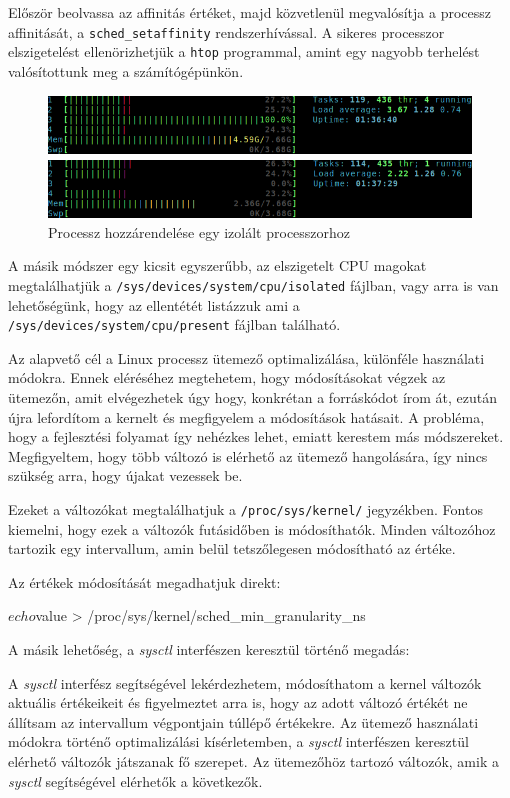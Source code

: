 Először beolvassa az affinitás értéket, majd közvetlenül megvalósítja a processz affinitását, a \texttt{sched\_setaffinity} rendszerhívással.
A sikeres processzor elszigetelést ellenörizhetjük a \texttt{htop} programmal, amint egy nagyobb terhelést valósítottunk meg a számítógépünkön.

\begin{figure}[h!]
\centering
\includegraphics[width=\textwidth]{images/tasksetHtop.png}
\caption{Processz hozzárendelése egy izolált processzorhoz}
\label{fig:taskset}
\end{figure}

A másik módszer egy kicsit egyszerűbb, az elszigetelt CPU magokat megtalálhatjük a \texttt{/sys/devices/system/cpu/isolated} fájlban, vagy arra is van lehetőségünk, hogy az ellentétét listázzuk ami a \texttt{/sys/devices/system/cpu/present} fájlban található.

Az alapvető cél a Linux processz ütemező optimalizálása, különféle használati módokra.
Ennek eléréséhez megtehetem, hogy módosításokat végzek az ütemezőn, amit elvégezhetek úgy hogy, konkrétan a forráskódot írom át, ezután újra lefordítom a kernelt és megfigyelem a módosítások hatásait.
A probléma, hogy a fejlesztési folyamat így nehézkes lehet, emiatt kerestem más módszereket.
Megfigyeltem, hogy több változó is elérhető az ütemező hangolására, így nincs szükség arra, hogy újakat vezessek be.

Ezeket a változókat megtalálhatjuk a \texttt{/proc/sys/kernel/} jegyzékben. Fontos kiemelni, hogy ezek a változók futásidőben is módosíthatók. Minden változóhoz tartozik egy intervallum, amin belül tetszőlegesen módosítható az értéke. 

Az értékek módosítását megadhatjuk direkt:
\begin{python}
$ echo $value > /proc/sys/kernel/sched_min_granularity_ns
\end{python}%

A másik lehetőség, a \textit{sysctl} interfészen keresztül történő megadás:
A \textit{sysctl} interfész segítségével lekérdezhetem, módosíthatom a kernel változók aktuális értékeikeit és figyelmeztet arra is, hogy az adott változó értékét ne állítsam az intervallum végpontjain túllépő értékekre.
Az ütemező használati módokra történő optimalizálási kísérletemben, a \textit{sysctl} interfészen keresztül elérhető változók játszanak fő szerepet. Az ütemezőhöz tartozó változók, amik a \textit{sysctl} segítségével elérhetők a következők.

